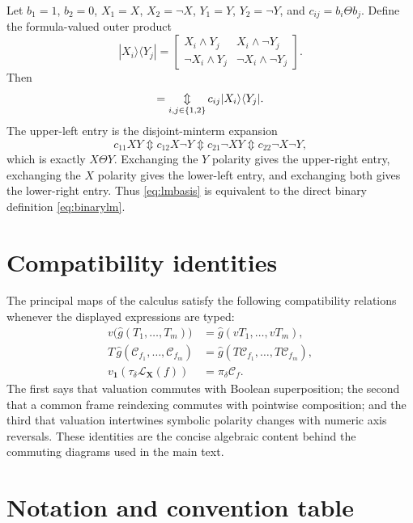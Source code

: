 \documentclass[11pt]{article}
\theoremstyle{definition}
\theoremstyle{remark}
\newcommand{\cC}{\mathcal C}
\newcommand{\xor}{\mathbin{\Updownarrow}}
\newcommand{\bigxor}{\mathop{\Updownarrow}\displaylimits}
\begin{document}
Let $b_1=1$, $b_2=0$, $X_1=X$, $X_2=\neg X$, $Y_1=Y$, $Y_2=\neg Y$, and $c_{ij}=b_i\Theta b_j$.  Define the formula-valued outer product
\[
 |X_i\rangle\langle Y_j|
 =\begin{bmatrix}
 X_i\land Y_j&X_i\land\neg Y_j\\
 \neg X_i\land Y_j&\neg X_i\land\neg Y_j
 \end{bmatrix}.
\]
Then
\begin{equation}
 [M_{X\Theta Y}]=\bigxor_{i,j\in\{1,2\}}
 c_{ij}|X_i\rangle\langle Y_j|.
 \label{eq:lmbasis}
\end{equation}
The upper-left entry is the disjoint-minterm expansion
\[
 c_{11}XY\xor c_{12}X\neg Y\xor c_{21}\neg X Y\xor c_{22}\neg X\neg Y,
\]
which is exactly $X\Theta Y$.  Exchanging the $Y$ polarity gives the upper-right entry, exchanging the $X$ polarity gives the lower-left entry, and exchanging both gives the lower-right entry.  Thus \eqref{eq:lmbasis} is equivalent to the direct binary definition \eqref{eq:binarylm}.

\section{Compatibility identities}

The principal maps of the calculus satisfy the following compatibility relations whenever the displayed expressions are typed:
\begin{align*}
 v\bigl(\widehat g(T_1,\ldots,T_m)\bigr)
 &=\widehat g(vT_1,\ldots,vT_m),\\
 T\,\widehat g(\cC_{f_1},\ldots,\cC_{f_m})
 &=\widehat g(T\cC_{f_1},\ldots,T\cC_{f_m}),\\
 v_{\mathbf1}(\tau_\delta\mathcal L_{\mathbf X}(f))
 &=\pi_\delta\cC_f.
\end{align*}
The first says that valuation commutes with Boolean superposition; the second that a common frame reindexing commutes with pointwise composition; and the third that valuation intertwines symbolic polarity changes with numeric axis reversals.  These identities are the concise algebraic content behind the commuting diagrams used in the main text.

\section{Notation and convention table}
\end{document}

